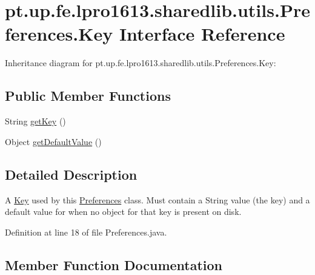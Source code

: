 \hypertarget{interfacept_1_1up_1_1fe_1_1lpro1613_1_1sharedlib_1_1utils_1_1_preferences_1_1_key}{}\section{pt.\+up.\+fe.\+lpro1613.\+sharedlib.\+utils.\+Preferences.\+Key Interface Reference}
\label{interfacept_1_1up_1_1fe_1_1lpro1613_1_1sharedlib_1_1utils_1_1_preferences_1_1_key}


Inheritance diagram for pt.\+up.\+fe.\+lpro1613.\+sharedlib.\+utils.\+Preferences.\+Key\+:
\subsection*{Public Member Functions}
\begin{DoxyCompactItemize}
\item 
String \hyperlink{interfacept_1_1up_1_1fe_1_1lpro1613_1_1sharedlib_1_1utils_1_1_preferences_1_1_key_af244cecb8edad1f87eaaa517c3590507}{get\+Key} ()
\item 
Object \hyperlink{interfacept_1_1up_1_1fe_1_1lpro1613_1_1sharedlib_1_1utils_1_1_preferences_1_1_key_aa78c759626a4e04578befd149e4c7310}{get\+Default\+Value} ()
\end{DoxyCompactItemize}


\subsection{Detailed Description}
A \hyperlink{interfacept_1_1up_1_1fe_1_1lpro1613_1_1sharedlib_1_1utils_1_1_preferences_1_1_key}{Key} used by this \hyperlink{classpt_1_1up_1_1fe_1_1lpro1613_1_1sharedlib_1_1utils_1_1_preferences}{Preferences} class. Must contain a String value (the key) and a default value for when no object for that key is present on disk. 

Definition at line 18 of file Preferences.\+java.



\subsection{Member Function Documentation}
\hypertarget{interfacept_1_1up_1_1fe_1_1lpro1613_1_1sharedlib_1_1utils_1_1_preferences_1_1_key_aa78c759626a4e04578befd149e4c7310}{}\label{interfacept_1_1up_1_1fe_1_1lpro1613_1_1sharedlib_1_1utils_1_1_preferences_1_1_key_aa78c759626a4e04578befd149e4c7310} 
